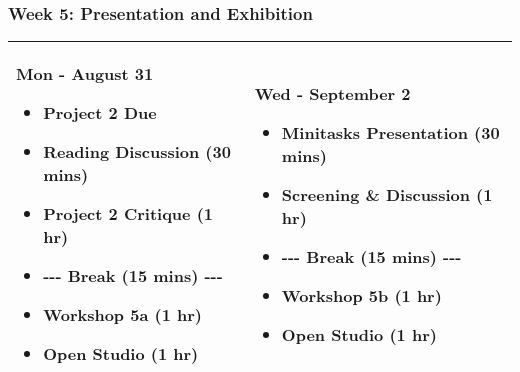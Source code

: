 \documentclass[10pt,letter,english]{article}
\begin{document}
\clearpage
\hypertarget{week-5-presentation-and-exhibition}{%
      \subsubsection{Week 5: Presentation and
            Exhibition}\label{week-5-presentation-and-exhibition}}

\begin{longtable}[]{@{}ll@{}}
      \toprule
      \endhead
      \begin{minipage}[t]{0.47\columnwidth}\raggedright
            \textbf{{Mon - August 31}}

            \begin{itemize}
                  \item
                        \textbf{Project 2 Due}
                  \item
                        Reading Discussion (30 mins)
                  \item
                        Project 2 Critique (1 hr)
                  \item
                        -\/-\/- Break (15 mins) -\/-\/-
                  \item
                        Workshop 5a (1 hr)
                  \item
                        Open Studio (1 hr)
            \end{itemize}\strut
      \end{minipage} & \begin{minipage}[t]{0.47\columnwidth}\raggedright
            \textbf{{Wed - September 2}}

            \begin{itemize}
                  \item
                        Minitasks Presentation (30 mins)
                  \item
                        Screening \& Discussion (1 hr)
                  \item
                        -\/-\/- Break (15 mins) -\/-\/-
                  \item
                        Workshop 5b (1 hr)
                  \item
                        Open Studio (1 hr)
            \end{itemize}\strut
      \end{minipage}\tabularnewline
      \bottomrule
\end{longtable}
\end{document}
